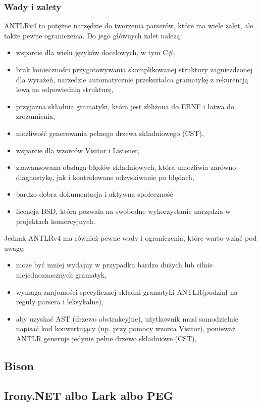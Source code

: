 \documentclass[12pt,twoside]{article}
\begin{document}
\subsubsection{Wady i zalety}
ANTLRv4 to potężne narzędzie do tworzenia parserów, które ma wiele zalet, ale także pewne ograniczenia. 
Do jego głównych zalet należą:
\begin{itemize}[label=\textbullet, leftmargin=1.25cm]
   \item wsparcie dla wielu języków docelowych, w tym C\#,
   \item brak konieczności przygotowywania skomplikowanej struktury zagnieżdżonej dla wyrażeń, narzedzie automatycznie przekształca gramatykę z rekurencją lewą na odpowiednią strukturę,
   \item przyjazna składnia gramatyki, która jest zbliżona do EBNF i łatwa do zrozumienia,
   \item możliwość generowania pełnego drzewa składniowego (CST),
   \item wsparcie dla wzorców Visitor i Listener,
   \item zaawansowana obsługa błędów składniowych, która umożliwia zarówno diagnostykę, jak i kontrolowane odzyskiwanie po błędach,
   \item bardzo dobra dokumentacja i aktywna społeczność
   \item licencja BSD, która pozwala na swobodne wykorzystanie narzędzia w projektach komercyjnych.
\end{itemize}

Jednak ANTLRv4 ma również pewne wady i ograniczenia, które warto wziąć pod uwagę:
\begin{itemize}[label=\textbullet, leftmargin=1.25cm]
   \item może być mniej wydajny w przypadku bardzo dużych lub silnie niejednoznacznych gramatyk,
   \item wymaga znajomości specyficznej składni gramatyki ANTLR(podział na reguły parsera i leksykalne),
   \item aby uzyskać AST (drzewo abstrakcyjne), użytkownik musi samodzielnie napisać kod konwertujący (np. przy pomocy wzorca Visitor), ponieważ ANTLR generuje jedynie pełne drzewo składniowe (CST),
\end{itemize}

\subsection{Bison}
\subsection{Irony.NET albo Lark albo PEG}
\end{document}
